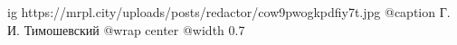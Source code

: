  
 
 
 
 

\ifcmt
  ig https://mrpl.city/uploads/posts/redactor/cow9pwogkpdfiy7t.jpg
	@caption Г. И. Тимошевский
  @wrap center
  @width 0.7
\fi
